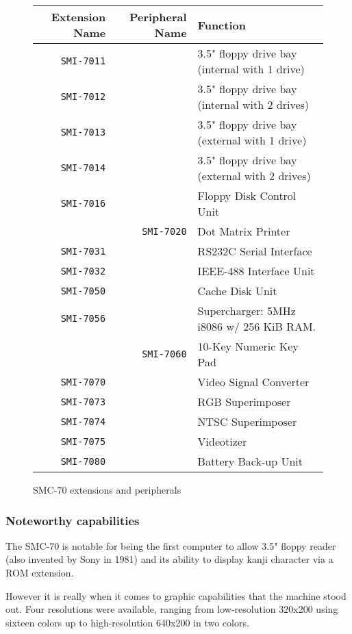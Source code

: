 \begin{figure}[H]

\begin{tabularx}{\textwidth}{rrX} 
  \toprule 
  \textbf{Extension Name} & \textbf{Peripheral Name} & \textbf{Function} \\               
  \toprule    
\texttt{SMI-7011} & & 3.5" floppy drive bay (internal with 1 drive)\\ 
\texttt{SMI-7012} & & 3.5" floppy drive bay (internal with 2 drives)\\ 
\texttt{SMI-7013} & & 3.5" floppy drive bay (external with 1 drive)\\ 
\texttt{SMI-7014} & & 3.5" floppy drive bay (external with 2 drives)\\ 
\texttt{SMI-7016} & & Floppy Disk Control Unit\\ 
 & \texttt{SMI-7020} & Dot Matrix Printer\\ 
\texttt{SMI-7031} & & RS232C Serial Interface\\ 
\texttt{SMI-7032} & & IEEE-488 Interface Unit\\ 
\texttt{SMI-7050} & & Cache Disk Unit\\ 
\texttt{SMI-7056} & & Supercharger: 5MHz i8086 w/ 256 KiB RAM.\\ 
 & \texttt{SMI-7060} & 10-Key Numeric Key Pad\\ 
\texttt{SMI-7070} & & Video Signal Converter\\ 
\texttt{SMI-7073} & & RGB Superimposer\\ 
\texttt{SMI-7074} & & NTSC Superimposer\\ 
\texttt{SMI-7075} & & Videotizer\\ 
\texttt{SMI-7080} & & Battery Back-up Unit\\ 
\toprule
\end{tabularx}%
\caption*{SMC-70 extensions and peripherals\cite{smc70tech}}
\end{figure}


\subsubsection{Noteworthy capabilities}
The SMC-70 is notable for being the first computer to allow 3.5" floppy reader (also invented by Sony in 1981) and its ability to display kanji character via a ROM extension. 

However it is really when it comes to graphic capabilities that the machine stood out. Four resolutions were available, ranging from low-resolution 320x200 using sixteen colors up to high-resolution 640x200 in two colors. 

